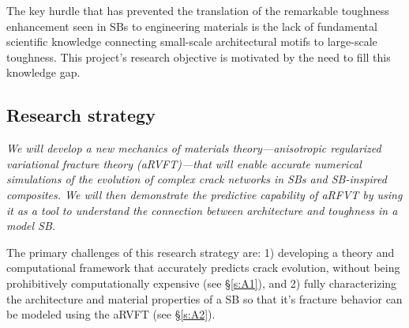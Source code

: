 \documentclass[10pt,letterpaper]{article}
\begin{document}
    The key hurdle that has prevented the translation of the remarkable toughness enhancement seen in SBs to engineering materials is the lack of fundamental scientific knowledge connecting small-scale architectural motifs to large-scale toughness. This project's research objective is motivated by the need to fill this knowledge gap.

  \subsection{Research strategy}
    \label{s:strat}
    \emph{We will develop a new mechanics of materials theory---anisotropic regularized variational fracture theory (aRVFT)---that will enable accurate numerical simulations of the evolution of complex crack networks in SBs and SB-inspired composites. We will then demonstrate the predictive capability of aRFVT by using it as a tool to understand the connection between architecture and toughness in a model SB.}%

    The primary challenges of this research strategy are: 1) developing a theory and computational framework that accurately predicts crack evolution, without being prohibitively computationally expensive (see \S \ref{s:A1}), and 2) fully characterizing the architecture and material properties of a SB so that it's fracture behavior can be modeled using the aRVFT (see \S \ref{s:A2}).

\end{document}

